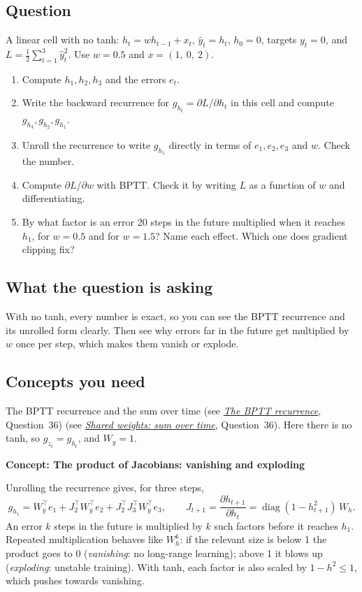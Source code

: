 \documentclass[12pt,a4paper]{article}
\newcommand{\concept}[2]{\par\medskip\phantomsection\label{#1}{\large\bfseries\color{blue!50!black} Concept: #2}\par}
\newcommand{\seeconcept}[3]{(see \hyperref[#1]{\textit{#2}}, Question~#3)}
\begin{document}
\subsection*{Question}
A linear cell with no tanh: $h_t=wh_{t-1}+x_t$, $\hat y_t=h_t$, $h_0=0$, targets $y_t=0$, and $L=\tfrac12\sum_{t=1}^3\hat y_t^2$. Use $w=0.5$ and $x=(1,\ 0,\ 2)$.
\begin{enumerate}[label=(\alph*)]
\item Compute $h_1,h_2,h_3$ and the errors $e_t$.
\item Write the backward recurrence for $g_{h_t}=\partial L/\partial h_t$ in this cell and compute $g_{h_3},g_{h_2},g_{h_1}$.
\item Unroll the recurrence to write $g_{h_1}$ directly in terms of $e_1,e_2,e_3$ and $w$. Check the number.
\item Compute $\partial L/\partial w$ with BPTT. Check it by writing $L$ as a function of $w$ and differentiating.
\item By what factor is an error 20 steps in the future multiplied when it reaches $h_1$, for $w=0.5$ and for $w=1.5$? Name each effect. Which one does gradient clipping fix?
\end{enumerate}

\subsection*{What the question is asking}
With no tanh, every number is exact, so you can see the BPTT recurrence and its unrolled form clearly. Then see why errors far in the future get multiplied by $w$ once per step, which makes them vanish or explode.

\subsection*{Concepts you need}
The BPTT recurrence and the sum over time \seeconcept{c:bpttrec}{The BPTT recurrence}{36} \seeconcept{c:bpttweights}{Shared weights: sum over time}{36}. Here there is no tanh, so $g_{z_t}=g_{h_t}$, and $W_y=1$.

\concept{c:jacprod}{The product of Jacobians: vanishing and exploding}
Unrolling the recurrence gives, for three steps,
\[
g_{h_1}=W_y^\top e_1+J_2^\top W_y^\top e_2+J_2^\top J_3^\top W_y^\top e_3,\qquad J_{t+1}=\frac{\partial h_{t+1}}{\partial h_t}=\operatorname{diag}(1-h_{t+1}^2)\,W_h .
\]
An error $k$ steps in the future is multiplied by $k$ such factors before it reaches $h_1$. Repeated multiplication behaves like $W_h^k$: if the relevant size is below 1 the product goes to 0 (\emph{vanishing}: no long-range learning); above 1 it blows up (\emph{exploding}: unstable training). With tanh, each factor is also scaled by $1-h^2\le1$, which pushes towards vanishing.
\end{document}

